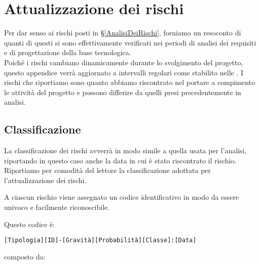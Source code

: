 
\newpage
\section{Attualizzazione dei rischi} \label{AttualizzazioneDeiRischi}
    Per dar senso ai rischi posti in \S\ref{AnalisiDeiRischi}, forniamo un resoconto di quanti di questi si sono effettivamente verificati nei periodi di analisi dei requisiti e di progettazione della base tecnologica.\\
    Poiché i rischi cambiano dinamicamente durante lo svolgimento del progetto, questo appendice verrà aggiornato a intervalli regolari come stabilito nelle \NdPd.
    I rischi che riportiamo sono quanto abbiamo riscontrato nel portare a compimento le attività del progetto e possono differire da quelli presi precedentemente in analisi.\\

	\subsection{Classificazione}
    La classificazione dei rischi avverrà in modo simile a quella usata per l'analisi, riportando in questo caso anche la data in cui è stato riscontrato il rischio.
    Riportiamo per comodità del lettore la classificazione adottata per l'attualizzazione dei rischi.

	A ciascun rischio viene assegnato un codice identificativo in modo da essere univoco e facilmente riconoscibile.

	Questo codice è:

	\begin{center}
		\texttt{[Tipologia][ID]-[Gravità][Probabilità][Classe]:[Data]}
	\end{center}

	composto da:

